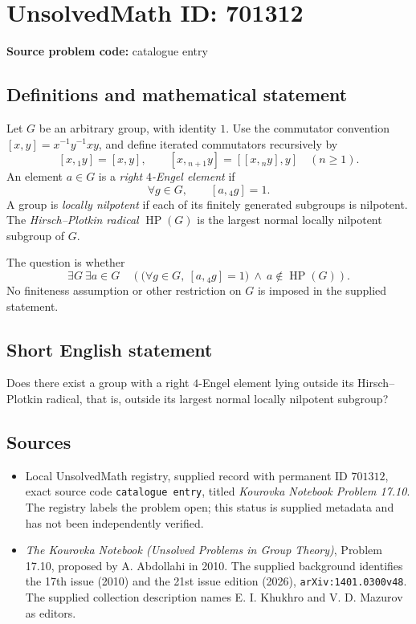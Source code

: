 \documentclass[11pt]{article}
\begin{document}
\section*{UnsolvedMath ID: 701312}
\textbf{Source problem code:} catalogue entry
\subsection{Definitions and mathematical statement}
Let \(G\) be an arbitrary group, with identity \(1\). Use the commutator convention \([x,y]=x^{-1}y^{-1}xy\), and define iterated commutators recursively by
\[
[x,{}_1 y]=[x,y],\qquad [x,{}_{n+1}y]=[[x,{}_n y],y]\quad(n\geq 1).
\]
An element \(a\in G\) is a \emph{right \(4\)-Engel element} if
\[
\forall g\in G,\qquad [a,{}_4 g]=1.
\]
A group is \emph{locally nilpotent} if each of its finitely generated subgroups is nilpotent. The \emph{Hirsch--Plotkin radical} \(\operatorname{HP}(G)\) is the largest normal locally nilpotent subgroup of \(G\).

The question is whether
\[
\exists G\ \exists a\in G\quad
\left(\bigl(\forall g\in G,\ [a,{}_4 g]=1\bigr)
\ \land\ a\notin\operatorname{HP}(G)\right).
\]
No finiteness assumption or other restriction on \(G\) is imposed in the supplied statement.
\subsection{Short English statement}
Does there exist a group with a right \(4\)-Engel element lying outside its Hirsch--Plotkin radical, that is, outside its largest normal locally nilpotent subgroup?
\subsection{Sources}
\begin{itemize}
\item Local UnsolvedMath registry, supplied record with permanent ID \(701312\), exact source code \texttt{catalogue entry}, titled \emph{Kourovka Notebook Problem 17.10}. The registry labels the problem open; this status is supplied metadata and has not been independently verified.
\item \emph{The Kourovka Notebook (Unsolved Problems in Group Theory)}, Problem 17.10, proposed by A. Abdollahi in 2010. The supplied background identifies the 17th issue (2010) and the 21st issue edition (2026), \texttt{arXiv:1401.0300v48}. The supplied collection description names E. I. Khukhro and V. D. Mazurov as editors.
\end{itemize}
\end{document}
